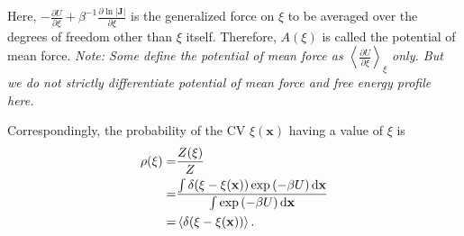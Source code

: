 Here, $-\frac{\partial U}{\partial \xi}+\beta^{-1}\frac{\partial \ln |\mathbf{J}|}{\partial \xi}$ is the generalized force on $\xi$ to be averaged over the degrees of freedom other than $\xi$ itself. Therefore, $A(\xi)$ is called the potential of mean force. \textit{Note: Some define the potential of mean force as $\left<\frac{\partial U}{\partial \xi}\right>_\xi$ only. But we do not strictly differentiate potential of mean force and free energy profile here.}

Correspondingly, the probability of the CV $\xi(\mathbf{x})$ having a value of $\xi$ is
\begin{align}
	\rho(\xi)=&\frac{Z(\xi)}{Z}\notag\\
	         =&\frac{\int \delta(\xi-\xi(\mathbf{x}))\exp{\left(-\beta U\right)}\mathop{}\!\mathrm{d}\mathbf{x}}{\int \exp{\left(-\beta U\right)}\mathop{}\!\mathrm{d}\mathbf{x}}\notag\\
	         =&\left<\delta(\xi-\xi(\mathbf{x}))\right>.
\end{align}  

